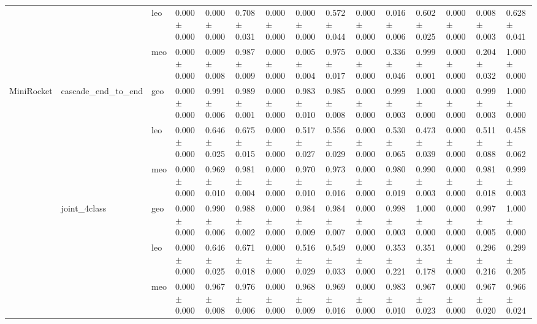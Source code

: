 \begin{table}
\begin{tabular}{lllllllllllllll}
            &              & leo &  0.000 $\pm$ 0.000 &  0.000 $\pm$ 0.000 &          0.708 $\pm$ 0.031 &  0.000 $\pm$ 0.000 &  0.000 $\pm$ 0.000 &          0.572 $\pm$ 0.044 &  0.000 $\pm$ 0.000 &  0.016 $\pm$ 0.006 &          0.602 $\pm$ 0.025 &  0.000 $\pm$ 0.000 &  0.008 $\pm$ 0.003 &          0.628 $\pm$ 0.041 \\
            &              & meo &  0.000 $\pm$ 0.000 &  0.009 $\pm$ 0.008 &          0.987 $\pm$ 0.009 &  0.000 $\pm$ 0.000 &  0.005 $\pm$ 0.004 &          0.975 $\pm$ 0.017 &  0.000 $\pm$ 0.000 &  0.336 $\pm$ 0.046 &          0.999 $\pm$ 0.001 &  0.000 $\pm$ 0.000 &  0.204 $\pm$ 0.032 &          1.000 $\pm$ 0.000 \\
MiniRocket & cascade_end_to_end & geo &  0.000 $\pm$ 0.000 &  0.991 $\pm$ 0.006 &          0.989 $\pm$ 0.001 &  0.000 $\pm$ 0.000 &  0.983 $\pm$ 0.010 &          0.985 $\pm$ 0.008 &  0.000 $\pm$ 0.000 &  0.999 $\pm$ 0.003 &          1.000 $\pm$ 0.000 &  0.000 $\pm$ 0.000 &  0.999 $\pm$ 0.003 &          1.000 $\pm$ 0.000 \\
            &              & leo &  0.000 $\pm$ 0.000 &  0.646 $\pm$ 0.025 &          0.675 $\pm$ 0.015 &  0.000 $\pm$ 0.000 &  0.517 $\pm$ 0.027 &          0.556 $\pm$ 0.029 &  0.000 $\pm$ 0.000 &  0.530 $\pm$ 0.065 &          0.473 $\pm$ 0.039 &  0.000 $\pm$ 0.000 &  0.511 $\pm$ 0.088 &          0.458 $\pm$ 0.062 \\
            &              & meo &  0.000 $\pm$ 0.000 &  0.969 $\pm$ 0.010 &          0.981 $\pm$ 0.004 &  0.000 $\pm$ 0.000 &  0.970 $\pm$ 0.010 &          0.973 $\pm$ 0.016 &  0.000 $\pm$ 0.000 &  0.980 $\pm$ 0.019 &          0.990 $\pm$ 0.003 &  0.000 $\pm$ 0.000 &  0.981 $\pm$ 0.018 &          0.999 $\pm$ 0.003 \\
            & joint_4class & geo &  0.000 $\pm$ 0.000 &  0.990 $\pm$ 0.006 &          0.988 $\pm$ 0.002 &  0.000 $\pm$ 0.000 &  0.984 $\pm$ 0.009 &          0.984 $\pm$ 0.007 &  0.000 $\pm$ 0.000 &  0.998 $\pm$ 0.003 &          1.000 $\pm$ 0.000 &  0.000 $\pm$ 0.000 &  0.997 $\pm$ 0.005 &          1.000 $\pm$ 0.000 \\
            &              & leo &  0.000 $\pm$ 0.000 &  0.646 $\pm$ 0.025 &          0.671 $\pm$ 0.018 &  0.000 $\pm$ 0.000 &  0.516 $\pm$ 0.029 &          0.549 $\pm$ 0.033 &  0.000 $\pm$ 0.000 &  0.353 $\pm$ 0.221 &          0.351 $\pm$ 0.178 &  0.000 $\pm$ 0.000 &  0.296 $\pm$ 0.216 &          0.299 $\pm$ 0.205 \\
            &              & meo &  0.000 $\pm$ 0.000 &  0.967 $\pm$ 0.008 &          0.976 $\pm$ 0.006 &  0.000 $\pm$ 0.000 &  0.968 $\pm$ 0.009 &          0.969 $\pm$ 0.016 &  0.000 $\pm$ 0.000 &  0.983 $\pm$ 0.010 &          0.967 $\pm$ 0.023 &  0.000 $\pm$ 0.000 &  0.967 $\pm$ 0.020 &          0.966 $\pm$ 0.024 \\

\end{tabular}
\end{table}
